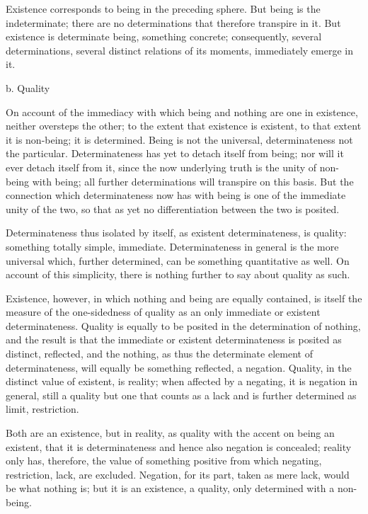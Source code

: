 Existence corresponds to being in the preceding sphere.
But being is the indeterminate;
there are no determinations that therefore transpire in it.
But existence is determinate being, something concrete;
consequently, several determinations,
several distinct relations of its moments,
immediately emerge in it.

b. Quality

On account of the immediacy with which being and nothing are
one in existence, neither oversteps the other;
to the extent that existence is existent,
to that extent it is non-being; it is determined.
Being is not the universal,
determinateness not the particular.
Determinateness has yet to detach itself from being;
nor will it ever detach itself from it,
since the now underlying truth is
the unity of non-being with being;
all further determinations will transpire on this basis.
But the connection which determinateness now has
with being is one of the immediate unity of the two,
so that as yet no differentiation between the two is posited.

Determinateness thus isolated by itself,
as existent determinateness, is quality:
something totally simple, immediate.
Determinateness in general is the more universal
which, further determined, can be something quantitative as well.
On account of this simplicity, there is nothing further to say
about quality as such.

Existence, however, in which nothing and being are equally contained,
is itself the measure of the one-sidedness
of quality as an only immediate or existent determinateness.
Quality is equally to be posited in the determination of nothing,
and the result is that the immediate or existent determinateness is
posited as distinct, reflected, and the nothing,
as thus the determinate element of determinateness,
will equally be something reflected, a negation.
Quality, in the distinct value of existent, is reality;
when affected by a negating, it is negation in general,
still a quality but one that counts as a lack
and is further determined as limit, restriction.

Both are an existence, but in reality,
as quality with the accent on being an existent,
that it is determinateness and hence also negation is concealed;
reality only has, therefore, the value of something positive
from which negating, restriction, lack, are excluded.
Negation, for its part, taken as mere lack,
would be what nothing is;
but it is an existence, a quality,
only determined with a non-being.

